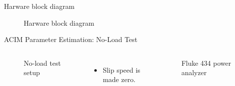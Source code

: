 \begin{frame}{Harware block diagram}
	\begin{figure}
		\centering


		\caption{Harware block diagram}
	\end{figure}
\end{frame}


\begin{frame}{ACIM Parameter Estimation: No-Load Test}
	\begin{columns}
		\begin{figure}
		  \centering
		  \caption{No-load test setup}
		\end{figure}
		\begin{itemize}
		  \item Slip speed is made zero.
		\end{itemize}
		\begin{figure}
		  \centering
		  \caption{Fluke 434 power analyzer}
		\end{figure}
	\end{columns}
  \end{frame}

